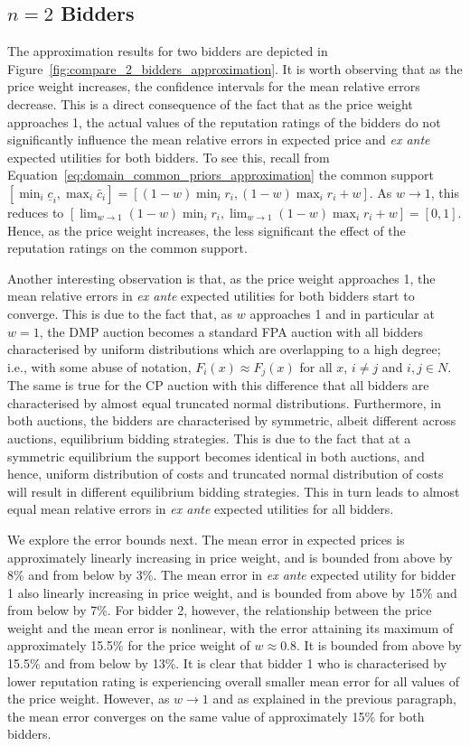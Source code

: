 \subsection{$n=2$ Bidders} %
\label{sub:n_2_bidders_approximation}
The approximation results for two bidders are depicted in Figure~\ref{fig:compare_2_bidders_approximation}. It is worth observing that as the price weight increases, the confidence intervals for the mean relative errors decrease. This is a direct consequence of the fact that as the price weight approaches 1, the actual values of the reputation ratings of the bidders do not significantly influence the mean relative errors in expected price and \emph{ex ante} expected utilities for both bidders. To see this, recall from Equation~\eqref{eq:domain_common_priors_approximation} the common support $[\min_i{\underline{c}_i}, \max_i{\bar{c}_i}]=[(1-w)\min_i{r_i}, (1-w)\max_i{r_i} + w]$. As $w\to 1$, this reduces to $[\lim_{w\to 1}(1-w)\min_i{r_i}, \lim_{w\to 1}(1-w)\max_i{r_i} + w] = [0,1]$. Hence, as the price weight increases, the less significant the effect of the reputation ratings on the common support.

Another interesting observation is that, as the price weight approaches 1, the mean relative errors in \emph{ex ante} expected utilities for both bidders start to converge. This is due to the fact that, as $w$ approaches 1 and in particular at $w=1$, the DMP auction becomes a standard FPA auction with all bidders characterised by uniform distributions which are overlapping to a high degree; i.e., with some abuse of notation, $F_i(x)\approx F_j(x)$ for all $x$, $i\neq j$ and $i,j\in N$. The same is true for the CP auction with this difference that all bidders are characterised by almost equal truncated normal distributions. Furthermore, in both auctions, the bidders are characterised by symmetric, albeit different across auctions, equilibrium bidding strategies. This is due to the fact that at a symmetric equilibrium the support becomes identical in both auctions, and hence, uniform distribution of costs and truncated normal distribution of costs will result in different equilibrium bidding strategies. This in turn leads to almost equal mean relative errors in \emph{ex ante} expected utilities for all bidders.

We explore the error bounds next. The mean error in expected prices is approximately linearly increasing in price weight, and is bounded from above by 8\% and from below by 3\%. The mean error in \emph{ex ante} expected utility for bidder 1 also linearly increasing in price weight, and is bounded from above by 15\% and from below by 7\%. For bidder 2, however, the relationship between the price weight and the mean error is nonlinear, with the error attaining its maximum of approximately 15.5\% for the price weight of $w\approx 0.8$. It is bounded from above by 15.5\% and from below by 13\%. It is clear that bidder 1 who is characterised by lower reputation rating is experiencing overall smaller mean error for all values of the price weight. However, as $w\to 1$ and as explained in the previous paragraph, the mean error converges on the same value of approximately 15\% for both bidders.

